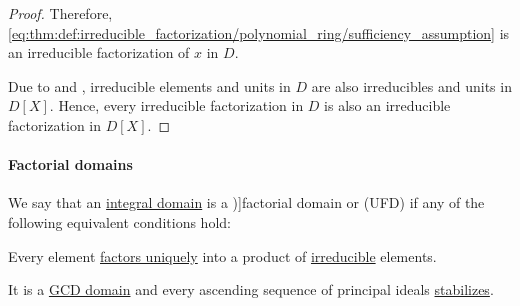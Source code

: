\begin{proof}
  Therefore, \eqref{eq:thm:def:irreducible_factorization/polynomial_ring/sufficiency_assumption} is an irreducible factorization of \( x \) in \( D \).

  \NecessitySubProof* Due to  and , irreducible elements and units in \( D \) are also irreducibles and units in \( D[X] \). Hence, every irreducible factorization in \( D \) is also an irreducible factorization in \( D[X] \).
\end{proof}

\paragraph{Factorial domains}

\begin{definition}\label{def:factorial_domain}
  We say that an \hyperref[def:integral_domain]{integral domain} is a \term[ru=факториальное кольцо (\cite[def. 9.7.1]{Винберг2014Алгебра})]{factorial domain} or  (UFD) if any of the following equivalent conditions hold:
  \begin{thmenum}
     Every element \hyperref[def:irreducible_factorization/unique]{factors uniquely} into a product of \hyperref[def:domain_divisibility/irreducible]{irreducible} elements.

     It is a \hyperref[def:gcd_domain]{GCD domain} and every ascending sequence of principal ideals \hyperref[def:stabilizing_sequence]{stabilizes}.
  \end{thmenum}
\end{definition}
